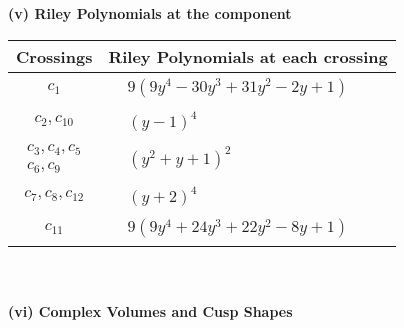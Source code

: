 \documentclass[1p]{elsarticle_modified}
\theoremstyle{definition}
\begin{document}
\newpage\renewcommand{\arraystretch}{1}
\flushleft \textbf{(v) Riley Polynomials at the component}\newline \\
\begin{tabular}{m{50pt}|m{274pt}}
Crossings & \hspace{64pt}Riley Polynomials at each crossing \\
\hline $$\begin{aligned}c_{1}\end{aligned}$$&$\begin{aligned}
&9(9 y^4-30 y^3+31 y^2-2 y+1)
\end{aligned}$\\
\hline $$\begin{aligned}c_{2},c_{10}\end{aligned}$$&$\begin{aligned}
&(y-1)^4
\end{aligned}$\\
\hline $$\begin{aligned}c_{3},c_{4},c_{5}\\c_{6},c_{9}\end{aligned}$$&$\begin{aligned}
&(y^2+y+1)^2
\end{aligned}$\\
\hline $$\begin{aligned}c_{7},c_{8},c_{12}\end{aligned}$$&$\begin{aligned}
&(y+2)^4
\end{aligned}$\\
\hline $$\begin{aligned}c_{11}\end{aligned}$$&$\begin{aligned}
&9(9 y^4+24 y^3+22 y^2-8 y+1)
\end{aligned}$\\
\hline
\end{tabular}\\~\\
\newpage\flushleft \textbf{(vi) Complex Volumes and Cusp Shapes}
\end{document}
